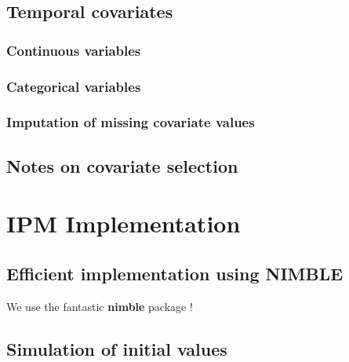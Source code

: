 \documentclass[
]{book}
\begin{document}
\hypertarget{temporal-covariates}{%
\section{Temporal covariates}\label{temporal-covariates}}

\hypertarget{continuous-variables}{%
\subsection{Continuous variables}\label{continuous-variables}}

\hypertarget{categorical-variables}{%
\subsection{Categorical variables}\label{categorical-variables}}

\hypertarget{imputation-of-missing-covariate-values}{%
\subsection{Imputation of missing covariate values}\label{imputation-of-missing-covariate-values}}

\hypertarget{notes-on-covariate-selection}{%
\section{Notes on covariate selection}\label{notes-on-covariate-selection}}

\hypertarget{IPMImp}{%
\chapter{IPM Implementation}\label{IPMImp}}

\hypertarget{efficient-implementation-using-nimble}{%
\section{Efficient implementation using NIMBLE}\label{efficient-implementation-using-nimble}}

We use the fantastic \textbf{nimble} package \citep{devalpine2017}!

\hypertarget{simulation-of-initial-values}{%
\section{Simulation of initial values}\label{simulation-of-initial-values}}
\end{document}
